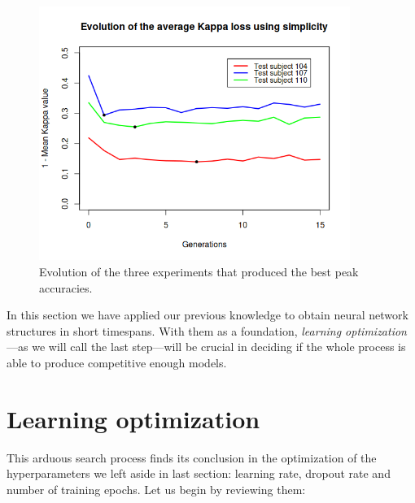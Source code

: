 	\begin{figure}[bth]

        \myfloatalign
        \includegraphics[width=0.9\textwidth]{gfx/SO_SimplicityEvolution.png}
        \caption{Evolution of the three experiments that produced the best peak accuracies.}\label{gfx:best_simplicity_evolution}

    \end{figure}

    In this section we have applied our previous knowledge to obtain neural network structures in short timespans. With them as a foundation, \textit{learning optimization}---as we will call the last step---will be crucial in deciding if the whole process is able to produce competitive enough models.

\section{Learning optimization}\label{sec:res_lo}

	This arduous search process finds its conclusion in the optimization of the hyperparameters we left aside in last section: learning rate, dropout rate and number of training epochs. Let us begin by reviewing them:

